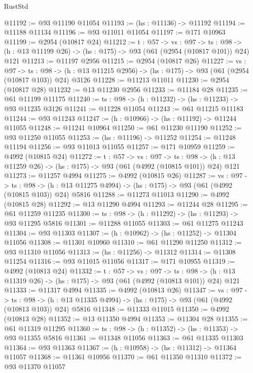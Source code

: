 \begin{lexlean}{RustStd}
\begin{coremodule}
@11192 := @93 @11190 @11054
@11193 := (hs : @11136) -> @11192
@11194 := @11188 @11134
@11196 := @93 @11011 @11054
@11197 := @171 @10963
@11199 := @2954 (@10817 @24)
@11212 := {t : @57} ->
  {vs : @97} ->
  {ts : @98} -> (h : @13 @11199 @26) -> (hs : @175) -> @93 (@61 (@2954 (@10817 @101)) @24) @121
@11213 := @11197 @2956
@11215 := @2954 (@10817 @26)
@11227 := {vs : @97} ->
  {ts : @98} -> (h : @13 @11215 @2956) -> (hs : @175) -> @93 (@61 (@2954 (@10817 @103)) @24) @3126
@11228 := @11213 @11011
@11230 := @2954 (@10817 @28)
@11232 := @13 @11230 @2956
@11233 := @11184 @28
@11235 := @61 @11199 @11175
@11240 := {ts : @98} -> (h : @11232) -> (hs : @11233) -> @93 @11235 @3126
@11241 := @11228 @11054
@11243 := @61 @11215 @11183
@11244 := @93 @11243
@11247 := (h : @10966) -> (hs : @11192) -> @11244 @11055
@11248 := @11241 @10964
@11250 := @61 @11230 @11190
@11252 := @93 @11250 @11055
@11253 := (hs : @11196) -> @11252
@11254 := @11248 @11194
@11256 := @93 @11013 @11055
@11257 := @171 @10959
@11259 := @4992 (@10815 @24)
@11272 := {t : @57} ->
  {vs : @97} ->
  {ts : @98} -> (h : @13 @11259 @26) -> (hs : @175) -> @93 (@61 (@4992 (@10815 @101)) @24) @121
@11273 := @11257 @4994
@11275 := @4992 (@10815 @26)
@11287 := {vs : @97} ->
  {ts : @98} -> (h : @13 @11275 @4994) -> (hs : @175) -> @93 (@61 (@4992 (@10815 @103)) @24) @5816
@11288 := @11273 @11013
@11290 := @4992 (@10815 @28)
@11292 := @13 @11290 @4994
@11293 := @11244 @28
@11295 := @61 @11259 @11235
@11300 := {ts : @98} -> (h : @11292) -> (hs : @11293) -> @93 @11295 @5816
@11301 := @11288 @11055
@11303 := @61 @11275 @11243
@11304 := @93 @11303
@11307 := (h : @10962) -> (hs : @11252) -> @11304 @11056
@11308 := @11301 @10960
@11310 := @61 @11290 @11250
@11312 := @93 @11310 @11056
@11313 := (hs : @11256) -> @11312
@11314 := @11308 @11254
@11316 := @93 @11015 @11056
@11317 := @171 @10955
@11319 := @4992 (@10813 @24)
@11332 := {t : @57} ->
  {vs : @97} ->
  {ts : @98} -> (h : @13 @11319 @26) -> (hs : @175) -> @93 (@61 (@4992 (@10813 @101)) @24) @121
@11333 := @11317 @4994
@11335 := @4992 (@10813 @26)
@11347 := {vs : @97} ->
  {ts : @98} -> (h : @13 @11335 @4994) -> (hs : @175) -> @93 (@61 (@4992 (@10813 @103)) @24) @5816
@11348 := @11333 @11015
@11350 := @4992 (@10813 @28)
@11352 := @13 @11350 @4994
@11353 := @11304 @28
@11355 := @61 @11319 @11295
@11360 := {ts : @98} -> (h : @11352) -> (hs : @11353) -> @93 @11355 @5816
@11361 := @11348 @11056
@11363 := @61 @11335 @11303
@11364 := @93 @11363
@11367 := (h : @10958) -> (hs : @11312) -> @11364 @11057
@11368 := @11361 @10956
@11370 := @61 @11350 @11310
@11372 := @93 @11370 @11057

\end{coremodule}
\end{lexlean}
